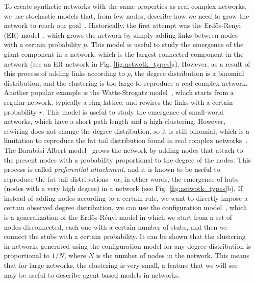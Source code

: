 To create synthetic networks with the same properties as real complex networks, we use stochastic models that, from few nodes, describe how we need to grow the network to reach our goal~\cite{posfai2016network}. Historically, the first attempt was the Erd\H{o}s-Renyi (ER) model~\cite{erdos1960evolution}, which grows the network by simply adding links between nodes with a certain probability $p$. This model is useful to study the emergence of the giant component in a network, which is the largest connected component in the network (see an ER network in Fig. \ref{fig:netwotk_types}a). However, as a result of this process of adding links according to $p$, the degree distribution is a binomial distribution, and the clustering is too large to reproduce a real complex network. Another popular example is the Watts-Strogatz model~\cite{watts1998collective}, which starts from a regular network, typically a ring lattice, and rewires the links with a certain probability $r$. This model is useful to study the emergence of small-world networks, which have a short path length and a high clustering. However, rewiring does not change the degree distribution, so it is still binomial, which is a limitation to reproduce the fat tail distribution found in real complex networks~\cite{newman2003structure}. The Barab\'asi-Albert model~\cite{barabasi1999emergence} grows the network by adding nodes that attach to the present nodes with a probability proportional to the degree of the nodes. This process is called \textit{preferential attachment}, and it is known to be useful to reproduce the fat tail distributions~\cite{merton1968matthew} or, in other words, the emergence of hubs (nodes with a very high degree) in a network (see Fig. \ref{fig:netwotk_types}b). If instead of adding nodes according to a certain rule, we want to directly impose a certain observed degree distribution, we can use the configuration model~\cite{newman-book}, which is a generalization of the Erd\H{o}s-R\'enyi model in which we start from a set of nodes disconnected, each one with a certain number of stubs, and then we connect the stubs with a certain probability. It can be shown that the clustering in networks generated using the configuration model for any degree distribution is proportional to $1/N$, where $N$ is the number of nodes in the network. This means that for large networks, the clustering is very small, a feature that we will see may be useful to describe agent based models in networks.

